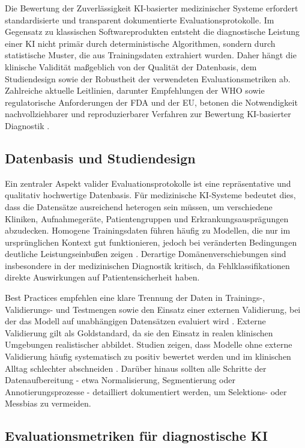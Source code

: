 \documentclass[lettersize,journal]{IEEEtran}
\begin{document}
	
	Die Bewertung der Zuverlässigkeit KI-basierter medizinischer Systeme erfordert standardisierte und transparent dokumentierte Evaluationsprotokolle. Im Gegensatz zu klassischen Softwareprodukten entsteht die diagnostische Leistung einer KI nicht primär durch deterministische Algorithmen, sondern durch statistische Muster, die aus Trainingsdaten extrahiert wurden. Daher hängt die klinische Validität maßgeblich von der Qualität der Datenbasis, dem Studiendesign sowie der Robustheit der verwendeten Evaluationsmetriken ab. Zahlreiche aktuelle Leitlinien, darunter Empfehlungen der WHO sowie regulatorische Anforderungen der FDA und der EU, betonen die Notwendigkeit nachvollziehbarer und reproduzierbarer Verfahren zur Bewertung KI-basierter Diagnostik \cite{ref:whoai2021,ref:fdaprinciples,ref:ema2023ai}.
	
\subsection{Datenbasis und Studiendesign}
	
	Ein zentraler Aspekt valider Evaluationsprotokolle ist eine repräsentative und qualitativ hochwertige Datenbasis. Für medizinische KI-Systeme bedeutet dies, dass die Datensätze ausreichend heterogen sein müssen, um verschiedene Kliniken, Aufnahmegeräte, Patientengruppen und Erkrankungsausprägungen abzudecken. Homogene Trainingsdaten führen häufig zu Modellen, die nur im ursprünglichen Kontext gut funktionieren, jedoch bei veränderten Bedingungen deutliche Leistungseinbußen zeigen \cite{ref:geirhos2020shortcut}. Derartige Domänenverschiebungen sind insbesondere in der medizinischen Diagnostik kritisch, da Fehlklassifikationen direkte Auswirkungen auf Patientensicherheit haben.
	
	Best Practices empfehlen eine klare Trennung der Daten in Trainings-, Validierungs- und Testmengen sowie den Einsatz einer externen Validierung, bei der das Modell auf unabhängigen Datensätzen evaluiert wird \cite{ref:kohane2019key}. Externe Validierung gilt als Goldstandard, da sie den Einsatz in realen klinischen Umgebungen realistischer abbildet. Studien zeigen, dass Modelle ohne externe Validierung häufig systematisch zu positiv bewertet werden und im klinischen Alltag schlechter abschneiden \cite{ref:liu2019comparison}. Darüber hinaus sollten alle Schritte der Datenaufbereitung - etwa Normalisierung, Segmentierung oder Annotierungsprozesse - detailliert dokumentiert werden, um Selektions- oder Messbias zu vermeiden.
	
\subsection{Evaluationsmetriken f\"ur diagnostische KI}
\end{document}
